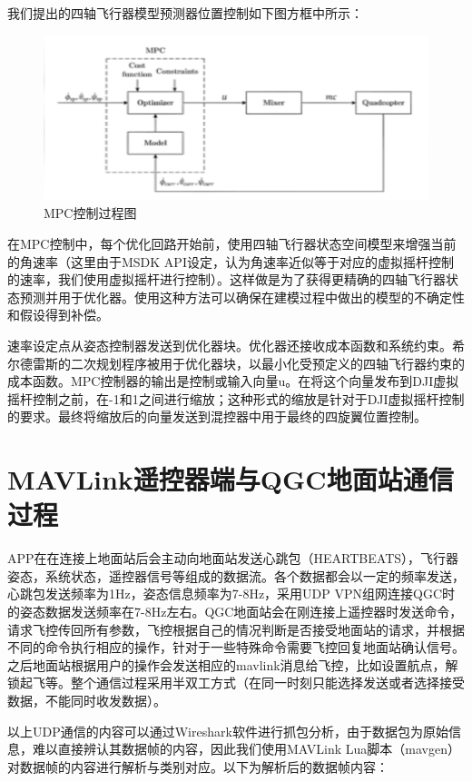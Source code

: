我们提出的四轴飞行器模型预测器位置控制如下图方框中所示：

\begin{figure}[ht]
  \centering
  \includegraphics[width=0.8\linewidth]{./Figure/MPC-Diagram.png}
  \caption{MPC控制过程图}\label{Fig:img10}
\end{figure}

在MPC控制中，每个优化回路开始前，使用四轴飞行器状态空间模型来增强当前的角速率（这里由于MSDK API设定，认为角速率近似等于对应的虚拟摇杆控制的速率，我们使用虚拟摇杆进行控制）。这样做是为了获得更精确的四轴飞行器状态预测并用于优化器。使用这种方法可以确保在建模过程中做出的模型的不确定性和假设得到补偿\cite{ArtE1}。

速率设定点从姿态控制器发送到优化器块。优化器还接收成本函数和系统约束。希尔德雷斯的二次规划程序被用于优化器块，以最小化受预定义的四轴飞行器约束的成本函数。MPC控制器的输出是控制或输入向量u。在将这个向量发布到DJI虚拟摇杆控制之前，在-1和1之间进行缩放；这种形式的缩放是针对于DJI虚拟摇杆控制的要求。最终将缩放后的向量发送到混控器中用于最终的四旋翼位置控制。

\section{MAVLink遥控器端与QGC地面站通信过程}

APP在在连接上地面站后会主动向地面站发送心跳包（HEARTBEATS），飞行器姿态，系统状态，遥控器信号等组成的数据流。各个数据都会以一定的频率发送，心跳包发送频率为1Hz，姿态信息频率为7-8Hz，采用UDP VPN组网连接QGC时的姿态数据发送频率在7-8Hz左右。QGC地面站会在刚连接上遥控器时发送命令，请求飞控传回所有参数，飞控根据自己的情况判断是否接受地面站的请求，并根据不同的命令执行相应的操作，针对于一些特殊命令需要飞控回复地面站确认信号。之后地面站根据用户的操作会发送相应的mavlink消息给飞控，比如设置航点，解锁起飞等。整个通信过程采用半双工方式（在同一时刻只能选择发送或者选择接受数据，不能同时收发数据）\cite{ArtE5}。

以上UDP通信的内容可以通过Wireshark软件进行抓包分析，由于数据包为原始信息，难以直接辨认其数据帧的内容，因此我们使用MAVLink Lua脚本（mavgen）对数据帧的内容进行解析与类别对应。以下为解析后的数据帧内容：

